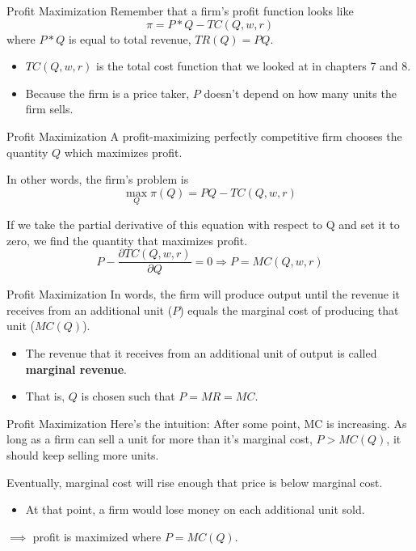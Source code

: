 \documentclass{beamer}
\begin{document}
\begin{frame}{Profit Maximization}
  Remember that a firm's profit function looks like
  $$
    \pi = P * Q - TC(Q,w,r)
  $$
  where $P * Q$ is equal to total revenue, $TR(Q) = PQ$.

  \begin{itemize}
    \item $TC(Q,w,r)$ is the total cost function that we looked at in chapters 7 and 8.
    
    \item Because the firm is a price taker, $P$ doesn't depend on how many units the firm sells.
  \end{itemize}
\end{frame}

\begin{frame}{Profit Maximization}
  A profit-maximizing perfectly competitive firm chooses the quantity $Q$ which maximizes profit.

  \bigskip
  In other words, the firm's problem is
  $$
    \max_Q \pi(Q) = PQ-TC(Q,w,r)
  $$

  \bigskip
  If we take the partial derivative of this equation with respect to Q and set it to zero, we find the quantity that maximizes profit.
  $$
    P-\frac{\partial TC(Q,w,r)}{\partial Q} = 0  \Rightarrow P = MC(Q,w,r)
  $$
\end{frame}

\begin{frame}{Profit Maximization}
  In words, the firm will produce output until the revenue it receives from an additional unit ($P$) equals the marginal cost of producing that unit ($MC(Q)$).

  \begin{itemize}
    \item The revenue that it receives from an additional unit of output is called \textbf{marginal revenue}.
    
    \item That is, $Q$ is chosen such that $P = MR = MC$.
  \end{itemize}
\end{frame}

\begin{frame}{Profit Maximization}
  Here's the intuition: After some point, MC is increasing. As long as a firm can sell a unit for more than it's marginal cost, $P > MC(Q)$, it should keep selling more units.

  \bigskip
  Eventually, marginal cost will rise enough that price is below marginal cost.

  \begin{itemize}
    \item At that point, a firm would lose money on each additional unit sold.
  \end{itemize}

  \bigskip
  $\implies$ profit is maximized where $P = MC(Q)$.
\end{frame}
\end{document}
